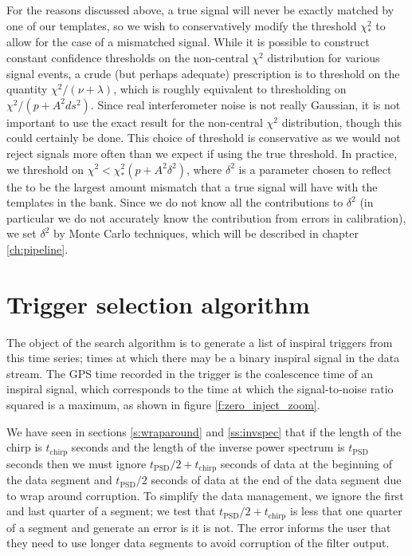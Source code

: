 For the reasons discussed above, a true signal will never be exactly matched
by one of our templates, so we wish to conservatively modify the threshold
$\chi^2_\ast$ to allow for the case of a mismatched signal. While it is
possible to construct constant confidence thresholds on the non-central
$\chi^2$ distribution for various signal events, a crude (but perhaps
adequate) prescription is to threshold on the quantity
$\chi^2/(\nu+\lambda)$, which is roughly equivalent to thresholding on
$\chi^2/(p+A^2 ds^2)$.  Since real interferometer noise is not really
Gaussian, it is not important to use the exact result for the non-central
$\chi^2$ distribution, though this could certainly be done. This choice of
threshold is conservative as we would not reject signals more often than we
expect if using the true threshold.  In practice, we
threshold on $\chi^2 < \chi^2_\ast (p+A^2 \delta^2)$, where $\delta^2$ is a
parameter chosen to reflect the to be the largest amount mismatch that a true
signal will have with the templates in the bank. Since we do not know all the
contributions to $\delta^2$ (in particular we do not accurately know the
contribution from errors in calibration), we set $\delta^2$ by Monte Carlo
techniques, which will be described in chapter \ref{ch:pipeline}.

\section{Trigger selection algorithm}
\label{s:maxoverchirp}

The object of the search algorithm is to generate a list of inspiral triggers
from this time series; times at which there may be a binary inspiral signal in
the data stream. The GPS time recorded in the trigger is the coalescence time of
an inspiral signal, which corresponds to the time at which the signal-to-noise
ratio squared is a maximum, as shown in figure \ref{f:zero_inject_zoom}.

We have seen in sections \ref{s:wraparound} and \ref{ss:invspec} that if the
length of the chirp is $t_\mathrm{chirp}$ seconds and the length of the
inverse power spectrum is $t_\mathrm{PSD}$ seconds then we must ignore
$t_\mathrm{PSD}/2 + t_\mathrm{chirp}$ seconds of data at the beginning of the
data segment and $t_\mathrm{PSD}/2$ seconds of data at the end of the data
segment due to wrap around corruption. To simplify the data management, we
ignore the first and last quarter of a segment; we test that $t_\mathrm{PSD}/2
+ t_\mathrm{chirp}$ is less that one quarter of a segment and generate an
error is it is not. The error informs the user that they need to use longer
data segments to avoid corruption of the filter output.

